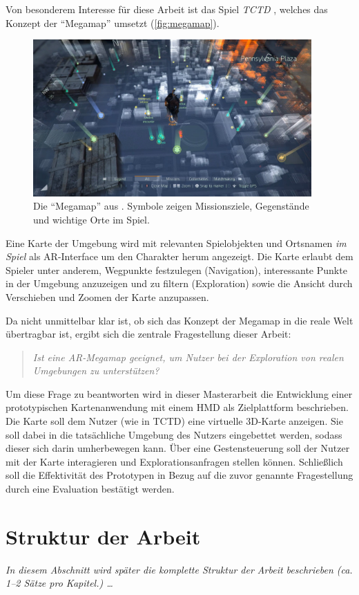 Von besonderem Interesse für diese Arbeit ist das Spiel \emph{\gls{TCTD}} \parencite{Ubisoft2018}, welches das Konzept der \enquote{Megamap} umsetzt (\autoref{fig:megamap}).
\begin{figure}[h]
	\centering
	\includegraphics[width=0.95\textwidth]{figures/the_division_megamap.jpg}
	\caption{Die \enquote{Megamap} aus \emph{}. Symbole zeigen Missionsziele, Gegenstände und wichtige Orte im Spiel. }
	\label{fig:megamap}
\end{figure}
Eine Karte der Umgebung wird mit relevanten Spielobjekten und Ortsnamen \emph{im Spiel} als \gls{AR}-Interface um den Charakter herum angezeigt.
Die Karte erlaubt dem Spieler unter anderem, Wegpunkte festzulegen (Navigation), interessante Punkte in der Umgebung anzuzeigen und zu filtern (Exploration) sowie die Ansicht durch Verschieben und Zoomen der Karte anzupassen.

Da nicht unmittelbar klar ist, ob sich das Konzept der Megamap in die reale Welt übertragbar ist, ergibt sich die zentrale Fragestellung dieser Arbeit:
\begin{quote}
\itshape
Ist eine \gls{AR}-Megamap geeignet, um Nutzer bei der Exploration von \emph{realen} Umgebungen zu unterstützen?
\end{quote}
Um diese Frage zu beantworten wird in dieser Masterarbeit die Entwicklung einer prototypischen Kartenanwendung mit einem \gls{HMD} als Zielplattform beschrieben.
Die Karte soll dem Nutzer (wie in \gls{TCTD}) eine virtuelle 3D-Karte anzeigen.
Sie soll dabei in die tatsächliche Umgebung des Nutzers eingebettet werden, sodass dieser sich darin umherbewegen kann.
Über eine Gestensteuerung soll der Nutzer mit der Karte interagieren und Explorationsanfragen stellen können.
Schließlich soll die Effektivität des Prototypen in Bezug auf die zuvor genannte Fragestellung durch eine Evaluation bestätigt werden.

\section{Struktur der Arbeit}
\label{sec:struktur}
{\itshape In diesem Abschnitt wird später die komplette Struktur der Arbeit beschrieben (ca. 1--2 Sätze pro Kapitel.) \dots}

%
\cleardoublepage